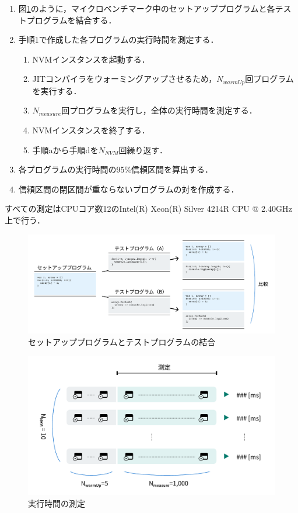 \documentclass[11pt]{jreport}
\begin{document}
\begin{enumerate}
    \item 図\ref{fig:concat}のように，マイクロベンチマーク中のセットアッププログラムと各テストプログラムを結合する．
    \item 手順1で作成した各プログラムの実行時間を測定する．
    \begin{enumerate}
        \item NVMインスタンスを起動する．
        \item JITコンパイラをウォーミングアップさせるため，\begin{math}N_{warmUp}\end{math}回プログラムを実行する．
        \item \begin{math}N_{measure}\end{math}回プログラムを実行し，全体の実行時間を測定する．
        \item NVMインスタンスを終了する．
        \item 手順aから手順dを\begin{math}N_{NVM}\end{math}回繰り返す．
    \end{enumerate}
    \item 各プログラムの実行時間の95\%信頼区間を算出する．
    \item 信頼区間の閉区間が重ならないプログラムの対を作成する．
\end{enumerate}


すべての測定はCPUコア数12のIntel(R) Xeon(R) Silver 4214R CPU @ 2.40GHz上で行う．


\begin{figure}[t]
\centerline{\includegraphics[width=0.96\linewidth]{Omori_fig/concat.pdf}}
\caption{セットアッププログラムとテストプログラムの結合}
\label{fig:concat}
\end{figure}

\begin{figure}[t]
\centerline{\includegraphics[width=0.768\linewidth]{Omori_fig/measure.pdf}}
\caption{実行時間の測定}
\label{fig-dummy}
\end{figure}
\end{document}
